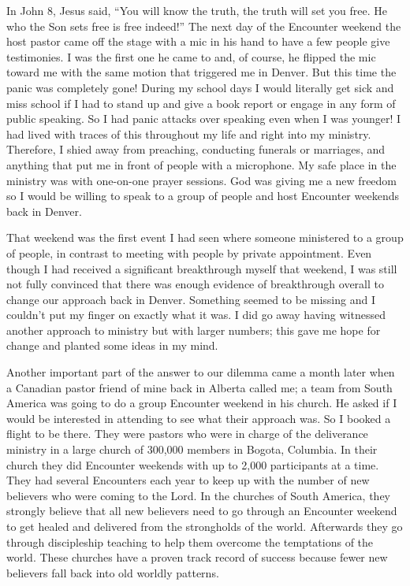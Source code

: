 \documentclass[oneside]{book}
\begin{document}
In John 8, Jesus said, “You will know the truth, the truth will set you free. He who the Son sets free is free indeed!” The next day of the Encounter weekend the host pastor came off the stage with a mic in his hand to have a few people give testimonies. I was the first one he came to and, of course, he flipped the mic toward me with the same motion that triggered me in Denver. But this time the panic was completely gone! During my school days I would literally get sick and miss school if I had to stand up and give a book report or engage in any form of public speaking. So I had panic attacks over speaking even when I was younger! I had lived with traces of this throughout my life and right into my ministry. Therefore, I shied away from preaching, conducting funerals or marriages, and anything that put me in front of people with a microphone. My safe place in the ministry was with one-on-one prayer sessions. God was giving me a new freedom so I would be willing to speak to a group of people and host Encounter weekends back in Denver. 


That weekend was the first event I had seen where someone ministered to a group of people, in contrast to meeting with people by private appointment. Even though I had received a significant breakthrough myself that weekend, I was still not fully convinced that there was enough evidence of breakthrough overall to change our approach back in Denver. Something seemed to be missing and I couldn’t put my finger on exactly what it was. I did go away having witnessed another approach to ministry but with larger numbers; this gave me hope for change and planted some ideas in my mind.

Another important part of the answer to our dilemma came a month later when a Canadian pastor friend of mine back in Alberta called me; a team from South America was going to do a group Encounter weekend in his church. He asked if I would be interested in attending to see what their approach was. So I booked a flight to be there. They were pastors who were in charge of the deliverance ministry in a large church of 300,000 members in Bogota, Columbia. In their church they did Encounter weekends with up to 2,000 participants at a time. They had several Encounters each year to keep up with the number of new believers who were coming to the Lord. In the churches of South America, they strongly believe that all new believers need to go through an Encounter weekend to get healed and delivered from the strongholds of the world. Afterwards they go through discipleship teaching to help them overcome the temptations of the world. These churches have a proven track record of success because fewer new believers fall back into old worldly patterns. 
\end{document}
